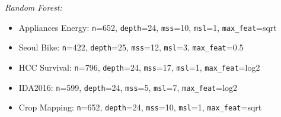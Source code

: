 \documentclass[
  11pt,
  onecolumn]{article}
\providecommand{\tightlist}{%
  \setlength{\itemsep}{0pt}\setlength{\parskip}{0pt}}
\begin{document}
\emph{Random Forest:}

\begin{itemize}
\tightlist
\item
  Appliances Energy: \texttt{n}=652, \texttt{depth}=24, \texttt{mss}=10,
  \texttt{msl}=1, \texttt{max\_feat}=sqrt
\item
  Seoul Bike: \texttt{n}=422, \texttt{depth}=25, \texttt{mss}=12,
  \texttt{msl}=3, \texttt{max\_feat}=0.5
\item
  HCC Survival: \texttt{n}=796, \texttt{depth}=24, \texttt{mss}=17,
  \texttt{msl}=1, \texttt{max\_feat}=log2
\item
  IDA2016: \texttt{n}=599, \texttt{depth}=24, \texttt{mss}=5,
  \texttt{msl}=7, \texttt{max\_feat}=log2
\item
  Crop Mapping: \texttt{n}=652, \texttt{depth}=24, \texttt{mss}=10,
  \texttt{msl}=1, \texttt{max\_feat}=sqrt
\end{itemize}
\end{document}
